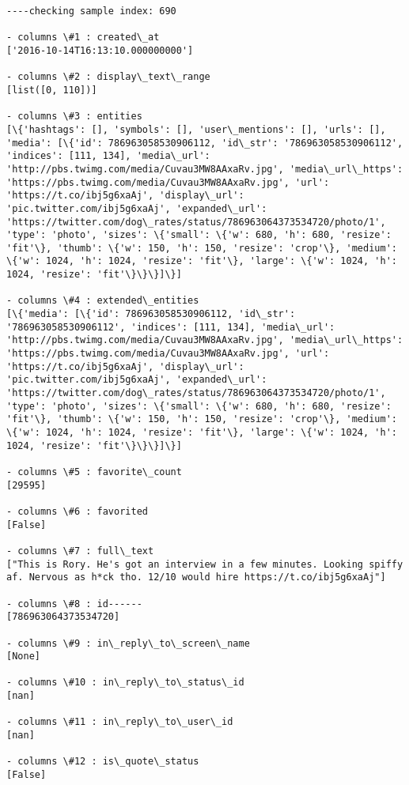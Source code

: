 \documentclass[11pt]{article}
\begin{document}
    \begin{Verbatim}[commandchars=\\\{\}]
----checking sample index: 690

- columns \#1 : created\_at
['2016-10-14T16:13:10.000000000']

- columns \#2 : display\_text\_range
[list([0, 110])]

- columns \#3 : entities
[\{'hashtags': [], 'symbols': [], 'user\_mentions': [], 'urls': [], 'media': [\{'id': 786963058530906112, 'id\_str': '786963058530906112', 'indices': [111, 134], 'media\_url': 'http://pbs.twimg.com/media/Cuvau3MW8AAxaRv.jpg', 'media\_url\_https': 'https://pbs.twimg.com/media/Cuvau3MW8AAxaRv.jpg', 'url': 'https://t.co/ibj5g6xaAj', 'display\_url': 'pic.twitter.com/ibj5g6xaAj', 'expanded\_url': 'https://twitter.com/dog\_rates/status/786963064373534720/photo/1', 'type': 'photo', 'sizes': \{'small': \{'w': 680, 'h': 680, 'resize': 'fit'\}, 'thumb': \{'w': 150, 'h': 150, 'resize': 'crop'\}, 'medium': \{'w': 1024, 'h': 1024, 'resize': 'fit'\}, 'large': \{'w': 1024, 'h': 1024, 'resize': 'fit'\}\}\}]\}]

- columns \#4 : extended\_entities
[\{'media': [\{'id': 786963058530906112, 'id\_str': '786963058530906112', 'indices': [111, 134], 'media\_url': 'http://pbs.twimg.com/media/Cuvau3MW8AAxaRv.jpg', 'media\_url\_https': 'https://pbs.twimg.com/media/Cuvau3MW8AAxaRv.jpg', 'url': 'https://t.co/ibj5g6xaAj', 'display\_url': 'pic.twitter.com/ibj5g6xaAj', 'expanded\_url': 'https://twitter.com/dog\_rates/status/786963064373534720/photo/1', 'type': 'photo', 'sizes': \{'small': \{'w': 680, 'h': 680, 'resize': 'fit'\}, 'thumb': \{'w': 150, 'h': 150, 'resize': 'crop'\}, 'medium': \{'w': 1024, 'h': 1024, 'resize': 'fit'\}, 'large': \{'w': 1024, 'h': 1024, 'resize': 'fit'\}\}\}]\}]

- columns \#5 : favorite\_count
[29595]

- columns \#6 : favorited
[False]

- columns \#7 : full\_text
["This is Rory. He's got an interview in a few minutes. Looking spiffy af. Nervous as h*ck tho. 12/10 would hire https://t.co/ibj5g6xaAj"]

- columns \#8 : id------
[786963064373534720]

- columns \#9 : in\_reply\_to\_screen\_name
[None]

- columns \#10 : in\_reply\_to\_status\_id
[nan]

- columns \#11 : in\_reply\_to\_user\_id
[nan]

- columns \#12 : is\_quote\_status
[False]


\end{Verbatim}
\end{document}
